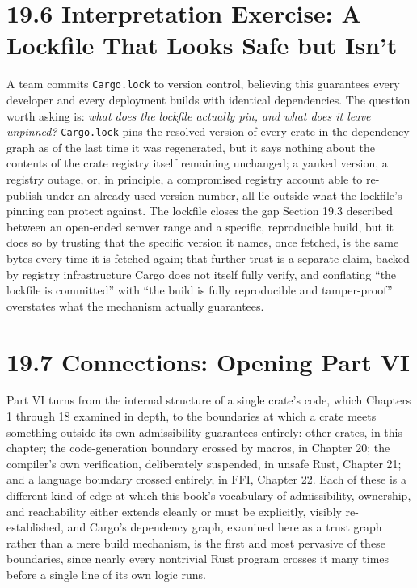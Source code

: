 \documentclass[11pt]{book}
\begin{document}
\section*{19.6 Interpretation Exercise: A Lockfile That Looks Safe but Isn't}

A team commits \texttt{Cargo.lock} to version control, believing this guarantees every developer and every deployment builds with identical dependencies. The question worth asking is: \emph{what does the lockfile actually pin, and what does it leave unpinned?} \texttt{Cargo.lock} pins the resolved version of every crate in the dependency graph as of the last time it was regenerated, but it says nothing about the contents of the crate registry itself remaining unchanged; a yanked version, a registry outage, or, in principle, a compromised registry account able to re-publish under an already-used version number, all lie outside what the lockfile's pinning can protect against. The lockfile closes the gap Section 19.3 described between an open-ended semver range and a specific, reproducible build, but it does so by trusting that the specific version it names, once fetched, is the same bytes every time it is fetched again; that further trust is a separate claim, backed by registry infrastructure Cargo does not itself fully verify, and conflating ``the lockfile is committed'' with ``the build is fully reproducible and tamper-proof'' overstates what the mechanism actually guarantees.

\section*{19.7 Connections: Opening Part VI}

Part VI turns from the internal structure of a single crate's code, which Chapters 1 through 18 examined in depth, to the boundaries at which a crate meets something outside its own admissibility guarantees entirely: other crates, in this chapter; the code-generation boundary crossed by macros, in Chapter 20; the compiler's own verification, deliberately suspended, in unsafe Rust, Chapter 21; and a language boundary crossed entirely, in FFI, Chapter 22. Each of these is a different kind of edge at which this book's vocabulary of admissibility, ownership, and reachability either extends cleanly or must be explicitly, visibly re-established, and Cargo's dependency graph, examined here as a trust graph rather than a mere build mechanism, is the first and most pervasive of these boundaries, since nearly every nontrivial Rust program crosses it many times before a single line of its own logic runs.
\end{document}
